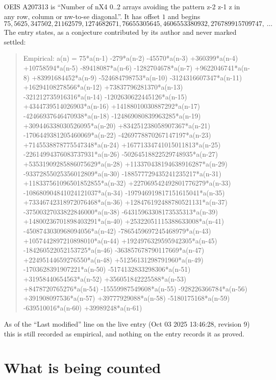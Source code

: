 \documentclass[11pt,a4paper]{article}
\theoremstyle{plain}
\theoremstyle{definition}
\begin{document}
OEIS A207313 is ``Number of nX4 0..2 arrays avoiding the pattern z-2 z-1 z in any row, column or nw-to-se diagonal.''. It has offset $1$ and begins
\[
75, 5625, 347502, 21162579, 1274682671, 76655305645, 4606553380932, 276789915709747,\ \dots
\]
The entry states, as a conjecture contributed by its author and never marked settled:
\begin{quote}
Empirical: a(n) = 75*a(n-1) -279*a(n-2) -45570*a(n-3) +360399*a(n-4) +10758594*a(n-5) -89418087*a(n-6) -1282704678*a(n-7) +9622046741*a(n-8) +83991684452*a(n-9) -524684798753*a(n-10) -3124316607347*a(n-11) +16294108278566*a(n-12) +73837796281370*a(n-13) -321212735916316*a(n-14) -1202630622445126*a(n-15) +4344739514026903*a(n-16) +14188010030887292*a(n-17) -42466937646470938*a(n-18) -124869080839963285*a(n-19) +309446338030526095*a(n-20) +834251238058907367*a(n-21) -1706449381205460069*a(n-22) -4269778870267147197*a(n-23) +7145538878775547348*a(n-24) +16771334741015011813*a(n-25) -22614994376083737931*a(n-26) -50264518822529748935*a(n-27) +53531909285886075629*a(n-28) +113370438194638916287*a(n-29) -93372855025356012809*a(n-30) -188577729435241235217*a(n-31) +118337561096501852855*a(n-32) +227069542492801776279*a(n-33) -108680904841024121037*a(n-34) -197946919817151615041*a(n-35) +73346742318972076468*a(n-36) +128476192488780521131*a(n-37) -37500327033822846000*a(n-38) -64315963308173535313*a(n-39) +14800236701898403291*a(n-40) +25322051115388633008*a(n-41) -4508743030968094056*a(n-42) -7865459697245468979*a(n-43) +1057442897210898010*a(n-44) +1924976329595942305*a(n-45) -184260522052153725*a(n-46) -363857678790117669*a(n-47) +22495144659276550*a(n-48) +51256131298791960*a(n-49) -1703628391907221*a(n-50) -5174132833298306*a(n-51) +31958440654563*a(n-52) +356051842225588*a(n-53) +8478720765276*a(n-54) -15559987549608*a(n-55) -928226366784*a(n-56) +391908097536*a(n-57) +39777929088*a(n-58) -5180175168*a(n-59) -639510016*a(n-60) +39989248*a(n-61)
\end{quote}
As of the ``Last modified'' line on the live entry (Oct 03 2025 13:46:28, revision 9) this is still
recorded as empirical, and nothing on the entry records it as proved.

\section{What is being counted}
\end{document}
